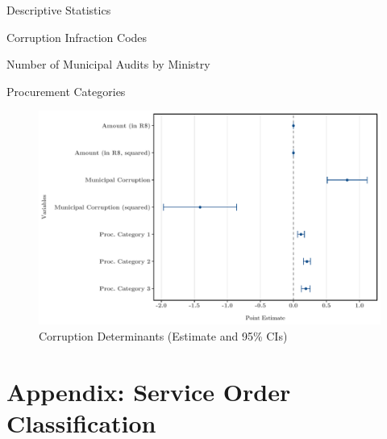 \documentclass[11pt]{article}
\begin{document}
\begin{table}[h]
\centering
\caption[table1]{Descriptive Statistics}\label{tab:descriptivestatistics}
\vspace{-10pt}

\end{table}

\begin{table}[h]
\centering
\caption[table2]{Corruption Infraction Codes}\label{tab:corruptioncodes}
\vspace{-10pt}

\end{table}

\begin{table}[h]
\centering
\caption[table3]{Number of Municipal Audits by Ministry}\label{tab:auditbyministry}
\vspace{-10pt}

\end{table}

\begin{table}[h]
\centering
\caption[table4]{Procurement Categories}\label{tab:procurementtypes}
\vspace{-10pt}

\end{table}

\begin{figure}[!htbp]
\centering
\caption[figure1]{Corruption Determinants (Estimate and 95\% CIs)}\label{fig:corruptiondeterminants}
\vspace{-10pt}
\includegraphics[scale = .70]{../plots/corr-determinats.pdf}
\end{figure}

\clearpage

\appendix

\section{Appendix: Service Order Classification} \label{sec:appendixA}
\end{document}
